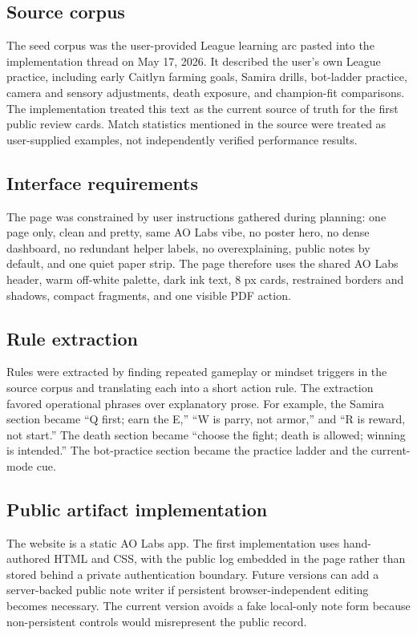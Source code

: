 \documentclass[12pt,letterpaper]{article}
\begin{document}
\subsection*{Source corpus}

The seed corpus was the user-provided League learning arc pasted into the implementation thread on May 17, 2026. It described the user's own League practice, including early Caitlyn farming goals, Samira drills, bot-ladder practice, camera and sensory adjustments, death exposure, and champion-fit comparisons. The implementation treated this text as the current source of truth for the first public review cards. Match statistics mentioned in the source were treated as user-supplied examples, not independently verified performance results.

\subsection*{Interface requirements}

The page was constrained by user instructions gathered during planning: one page only, clean and pretty, same AO Labs vibe, no poster hero, no dense dashboard, no redundant helper labels, no overexplaining, public notes by default, and one quiet paper strip. The page therefore uses the shared AO Labs header, warm off-white palette, dark ink text, 8 px cards, restrained borders and shadows, compact fragments, and one visible PDF action.

\subsection*{Rule extraction}

Rules were extracted by finding repeated gameplay or mindset triggers in the source corpus and translating each into a short action rule. The extraction favored operational phrases over explanatory prose. For example, the Samira section became ``Q first; earn the E,'' ``W is parry, not armor,'' and ``R is reward, not start.'' The death section became ``choose the fight; death is allowed; winning is intended.'' The bot-practice section became the practice ladder and the current-mode cue.

\subsection*{Public artifact implementation}

The website is a static AO Labs app. The first implementation uses hand-authored HTML and CSS, with the public log embedded in the page rather than stored behind a private authentication boundary. Future versions can add a server-backed public note writer if persistent browser-independent editing becomes necessary. The current version avoids a fake local-only note form because non-persistent controls would misrepresent the public record.
\end{document}
